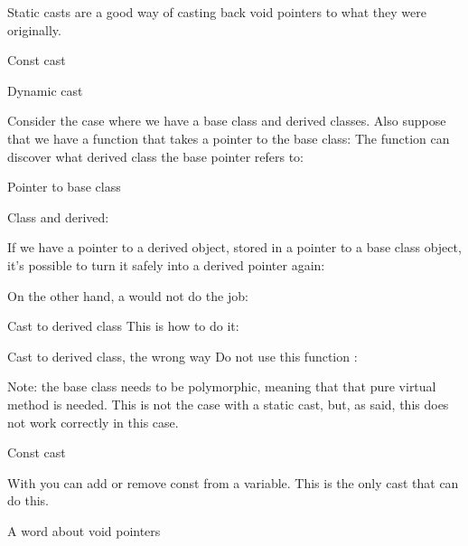 Static casts are a good way of casting back void pointers to what they
were originally.

\begin{slide}{Const cast}
  \label{sl:const-cast}
\end{slide}

 {Dynamic cast}

Consider the case where we have a base class and derived classes.
%
%
Also suppose that we have a function that takes a pointer to the base
class:
%
%
The function can discover what derived class the base pointer refers
to:
%

\begin{slide}{Pointer to base class}
  \label{sl:dyn-base-ptr}

  Class and derived:
\end{slide}

If we have a pointer to a derived object, stored in a pointer to a
base class object, it's possible to turn it safely into a derived
pointer again:
%

On the other hand, a  would not do the job:
%

\begin{slide}{Cast to derived class}
  \label{sl:dyn-cast}
  This is how to do it:
\end{slide}

\begin{slide}{Cast to derived class, the wrong way}
  \label{sl:dyn-cast-wrong}
  Do not use this function :
\end{slide}

Note: the base class needs to be polymorphic, meaning that that pure
virtual method is needed. This is not the case with a static cast,
but, as said, this does not work correctly in this case.

 {Const cast}

With  you can add or remove const from a
variable. This is the only cast that can do this.

 {A word about void pointers}

